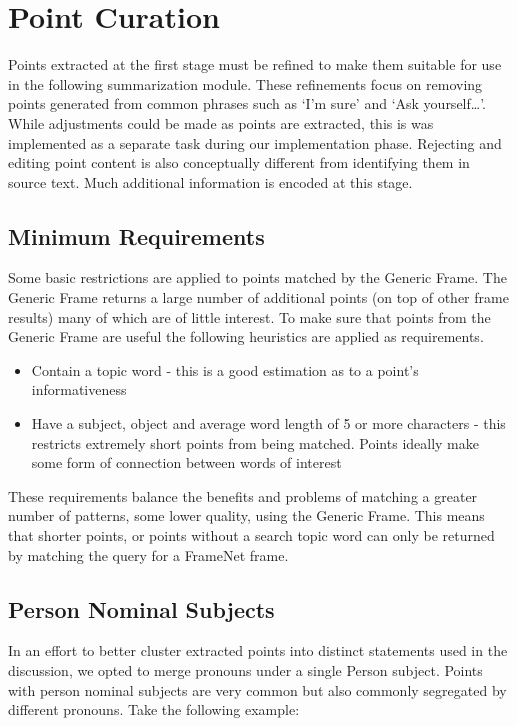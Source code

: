 \chapter{Point Curation\label{chap:point-curation}}
  Points extracted at the first stage must be refined to make them suitable for use in the following summarization module. These refinements focus on removing points generated from common phrases such as `I'm sure' and `Ask yourself\dots'. While adjustments could be made as points are extracted, this is was implemented as a separate task during our implementation phase. Rejecting and editing point content is also conceptually different from identifying them in source text. Much additional information is encoded at this stage.

  \section{Minimum Requirements}
    Some basic restrictions are applied to points matched by the Generic Frame. The Generic Frame returns a large number of additional points (on top of other frame results) many of which are of little interest. To make sure that points from the Generic Frame are useful the following heuristics are applied as requirements.

    \begin{itemize}
      \item{Contain a topic word - this is a good estimation as to a point's informativeness}
      \item{Have a subject, object and average word length of 5 or more characters - this restricts extremely short points from being matched. Points ideally make some form of connection between words of interest}
    \end{itemize}

    These requirements balance the benefits and problems of matching a greater number of patterns, some lower quality, using the Generic Frame. This means that shorter points, or points without a search topic word can only be returned by matching the query for a FrameNet frame.

  \section{Person Nominal Subjects}
    In an effort to better cluster extracted points into distinct statements used in the discussion, we opted to merge pronouns under a single Person subject. Points with person nominal subjects are very common but also commonly segregated by different pronouns. Take the following example:


